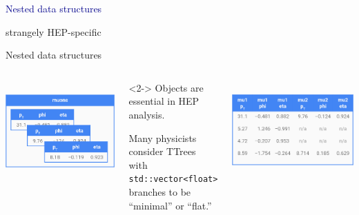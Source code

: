 \documentclass[aspectratio=169]{beamer}
\begin{document}
\begin{frame}{}
\huge
\vspace{0.5 cm}
\begin{center}
\textcolor{darkblue}{Nested data structures}

\large
\vspace{0.5 cm}
strangely HEP-specific
\end{center}
\end{frame}

\begin{frame}{Nested data structures}
\large
\vspace{0.5 cm}
\begin{columns}[t]
\mbox{ } \hfill \includegraphics[width=0.75\linewidth]{muons-as-objects.png} \hfill \mbox{ }

\vspace{0.25 cm}
\begin{uncoverenv}<2->
Objects are essential in HEP analysis.

\vspace{0.25 cm}
Many physicists consider TTrees with {\tt\small std::vector<float>} branches to be ``minimal'' or ``flat.''
\end{uncoverenv}

\mbox{ } \hfill \includegraphics[width=0.75\linewidth]{muons-as-a-table.png} \hfill \mbox{ }


\end{columns}
\end{frame}
\end{document}
